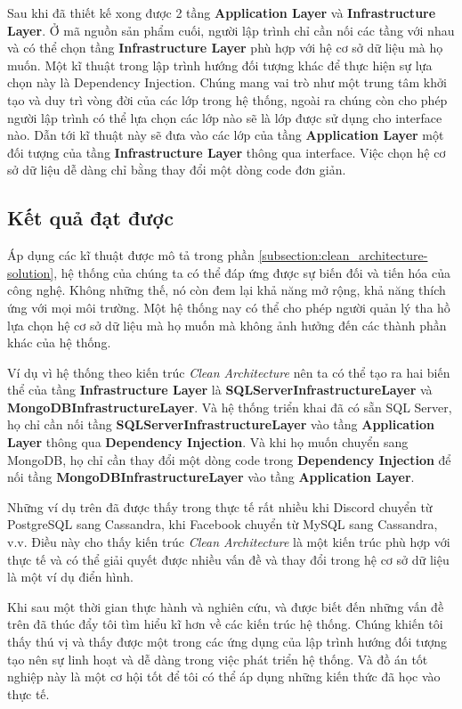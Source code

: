 \documentclass[../DoAn.tex]{subfiles}
\begin{document}
Sau khi đã thiết kế xong được 2 tầng \textbf{Application Layer} và \textbf{Infrastructure Layer}. Ở mã nguồn sản phẩm cuối, người lập trình chỉ cần nối các tầng với nhau và có thể chọn tầng \textbf{Infrastructure Layer} phù hợp với hệ cơ sở dữ liệu mà họ muốn. Một kĩ thuật trong lập trình hướng đối tượng khác để thực hiện sự lựa chọn này là Dependency Injection. Chúng mang vai trò như một trung tâm khởi tạo và duy trì vòng đời của các lớp trong hệ thống, ngoài ra chúng còn cho phép người lập trình có thể lựa chọn các lớp nào sẽ là lớp được sử dụng cho interface nào. Dẫn tới kĩ thuật này sẽ đưa vào các lớp của tầng \textbf{Application Layer} một đối tượng của tầng \textbf{Infrastructure Layer} thông qua interface. Việc chọn hệ cơ sở dữ liệu dễ dàng chỉ bằng thay đổi một dòng code đơn giản.
\vfill
\break

\subsection{Kết quả đạt được}
\label{subsection:clean_architecture-result}
Áp dụng các kĩ thuật được mô tả trong phần \ref{subsection:clean_architecture-solution}, hệ thống của chúng ta có thể đáp ứng được sự biến đối và tiến hóa của công nghệ. Không những thế, nó còn đem lại khả năng mở rộng, khả năng thích ứng với mọi môi trường. Một hệ thống nay có thể cho phép người quản lý tha hồ lựa chọn hệ cơ sở dữ liệu mà họ muốn mà không ảnh hưởng đến các thành phần khác của hệ thống.

Ví dụ vì hệ thống theo kiến trúc \textit{Clean Architecture} nên ta có thể tạo ra hai biến thể của tầng \textbf{Infrastructure Layer} là \textbf{SQLServerInfrastructureLayer} và \textbf{MongoDBInfrastructureLayer}. Và hệ thống triển khai đã có sẵn SQL Server, họ chỉ cần nối tầng \textbf{SQLServerInfrastructureLayer} vào tầng \textbf{Application Layer} thông qua \textbf{Dependency Injection}. Và khi họ muốn chuyển sang MongoDB, họ chỉ cần thay đổi một dòng code trong \textbf{Dependency Injection} để nối tầng \textbf{MongoDBInfrastructureLayer} vào tầng \textbf{Application Layer}.

Những ví dụ trên đã được thấy trong thực tế rất nhiều khi Discord chuyển từ PostgreSQL sang Cassandra, khi Facebook chuyển từ MySQL sang Cassandra, v.v. Điều này cho thấy kiến trúc \textit{Clean Architecture} là một kiến trúc phù hợp với thực tế và có thể giải quyết được nhiều vấn đề và thay đổi trong hệ cơ sở dữ liệu là một ví dụ điển hình.

Khi sau một thời gian thực hành và nghiên cứu, và được biết đến những vấn đề trên đã thúc đẩy tôi tìm hiểu kĩ hơn về các kiến trúc hệ thống. Chúng khiến tôi thấy thú vị và thấy được một trong các ứng dụng của lập trình hướng đối tượng tạo nên sự linh hoạt và dễ dàng trong việc phát triển hệ thống. Và đồ án tốt nghiệp này là một cơ hội tốt để tôi có thể áp dụng những kiến thức đã học vào thực tế.
\vfill
\break
\end{document}
